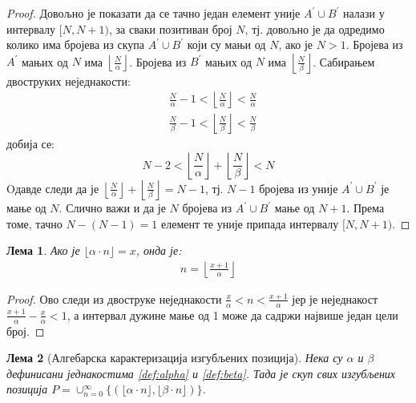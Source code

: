 \documentclass[a4paper]{article}
\newtheorem{lemma}{Лема}
\begin{document}
\begin{proof}
	Довољно је показати да се тачно један елемент уније $ A^{'} \cup B^{'} $ налази у интервалу $ [N,N+1) $, за сваки позитиван број $ N $, тј. довољно је да одредимо колико има бројева из скупа $ A^{'} \cup B^{'} $ који су мањи од $ N $, ако је $ N > 1 $. Бројева из $ A^{'} $ мањих од $ N $ има $ \left\lfloor \frac{N}{\alpha} \right\rfloor $. Бројева из $ B^{'} $ мањих од $ N $ има $ \left\lfloor \frac{N}{\beta} \right\rfloor $. Сабирањем двоструких неједнакости:
		\begin{eqnarray*}
			&\frac{N}{\alpha} - 1 < \left\lfloor \frac{N}{\alpha} \right\rfloor < \frac{N}{\alpha}\\
			&\frac{N}{\beta} - 1 < \left\lfloor \frac{N}{\beta} \right\rfloor < \frac{N}{\beta}
		\end{eqnarray*}	
	добија се:
		\begin{displaymath}
		N - 2 < \left\lfloor \frac{N}{\alpha} \right\rfloor + \left\lfloor \frac{N}{\beta} \right\rfloor < N
		\end{displaymath} 	
	Oдавде следи да је $ \left\lfloor \frac{N}{\alpha} \right\rfloor + \left\lfloor \frac{N}{\beta} \right\rfloor = N - 1 $, тј. $ N - 1 $ бројева из уније $ A^{'} \cup B^{'} $ је мање од $ N $. Слично важи и да је $ N $ бројева из $ A^{'} \cup B^{'} $ мање од $ N + 1 $. Према томе, тачно $ N - (N - 1) = 1 $ елемент те уније припада интервалу $ [N,N+1) $.
\end{proof}

\begin{lemma}
	\label{lemma:n}
	Ако је $ \lfloor \alpha \cdot n \rfloor = x $, онда је:
		\begin{eqnarray*}
			n = \left\lfloor \frac{x+1}{\alpha} \right\rfloor
		\end{eqnarray*}
\end{lemma}

\begin{proof}
	Ово следи из двоструке неједнакости $ \frac{x}{\alpha}<n<\frac{x+1}{\alpha} $ јер је неједнакост $ \frac{x+1}{\alpha} - \frac{x}{\alpha} < 1 $, а интервал дужине мање од 1 може да садржи највише један цели број.
\end{proof}

\begin{lemma}[Алгебарска карактеризација изгубљених позиција] Нека су $ \alpha $ и $ \beta $ дефинисани једнакостима \eqref{def:alpha} и \eqref{def:beta}. Тада је скуп свих изгубљених позиција $ P = \cup_{n=0}^{\infty} \{(\lfloor \alpha \cdot n \rfloor, \lfloor \beta \cdot n \rfloor)\} $.
\end{lemma}
\end{document}
